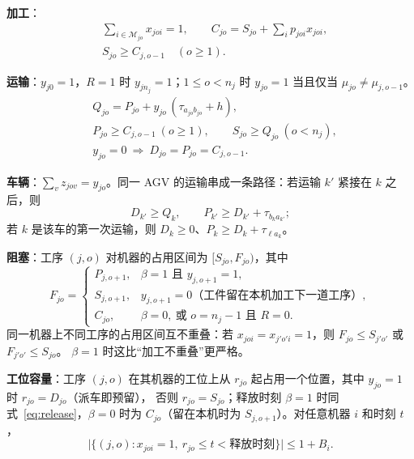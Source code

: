 \documentclass[11pt,a4paper]{ctexart}
\theoremstyle{definition}
\theoremstyle{remark}
\newcommand{\cM}{\mathcal{M}}
\newcommand{\LU}{\ell}
\begin{document}
\noindent\textbf{加工}：
\begin{align}
& \textstyle\sum_{i\in\cM_{jo}} x_{joi}=1,\qquad C_{jo}=S_{jo}+\sum_{i} p_{joi}x_{joi}, \label{eq:assign}\\
& S_{jo}\ge C_{j,o-1}\quad (o\ge 1). \label{eq:prec}
\end{align}

\noindent\textbf{运输}：$y_{j0}=1$，$R=1$ 时 $y_{jn_j}=1$；$1\le o<n_j$ 时 $y_{jo}=1$ 当且仅当 $\mu_{jo}\ne\mu_{j,o-1}$。
\begin{align}
& Q_{jo}=P_{jo}+y_{jo}\,(\tau_{a_{jo}b_{jo}}+h), \label{eq:trip}\\
& P_{jo}\ge C_{j,o-1}\ (o\ge 1),\qquad S_{jo}\ge Q_{jo}\ (o<n_j), \label{eq:handover}\\
& y_{jo}=0\ \Rightarrow\ D_{jo}=P_{jo}=C_{j,o-1}. \label{eq:notrip}
\end{align}

\noindent\textbf{车辆}：$\sum_{v} z_{jov}=y_{jo}$。同一 AGV 的运输串成一条路径：若运输 $k'$ 紧接在 $k$ 之后，则
\begin{equation}
D_{k'}\ge Q_k,\qquad P_{k'}\ge D_{k'}+\tau_{b_k a_{k'}}; \label{eq:vehicle}
\end{equation}
若 $k$ 是该车的第一次运输，则 $D_k\ge 0$、$P_k\ge D_k+\tau_{\LU a_k}$。

\noindent\textbf{阻塞}：工序 $(j,o)$ 对机器的占用区间为 $[S_{jo},F_{jo})$，其中
\begin{equation}
F_{jo}=\begin{cases}
P_{j,o+1}, & \beta=1 \text{ 且 } y_{j,o+1}=1,\\
S_{j,o+1}, & y_{j,o+1}=0 \text{（工件留在本机加工下一道工序）},\\
C_{jo}, & \beta=0,\ \text{或 } o=n_j-1 \text{ 且 } R=0.
\end{cases}\label{eq:release}
\end{equation}
同一机器上不同工序的占用区间互不重叠：若 $x_{joi}=x_{j'o'i}=1$，则 $F_{jo}\le S_{j'o'}$ 或 $F_{j'o'}\le S_{jo}$。
$\beta=1$ 时这比“加工不重叠”更严格。

\noindent\textbf{工位容量}：工序 $(j,o)$ 在其机器的工位上从 $r_{jo}$ 起占用一个位置，其中 $y_{jo}=1$ 时 $r_{jo}=D_{jo}$（派车即预留），
否则 $r_{jo}=S_{jo}$；释放时刻 $\beta=1$ 时同式~\eqref{eq:release}，$\beta=0$ 时为 $C_{jo}$（留在本机时为 $S_{j,o+1}$）。对任意机器 $i$ 和时刻 $t$，
\begin{equation}
\bigl|\{(j,o):x_{joi}=1,\ r_{jo}\le t<\text{释放时刻}\}\bigr|\le 1+B_i. \label{eq:buffer}
\end{equation}
\end{document}
